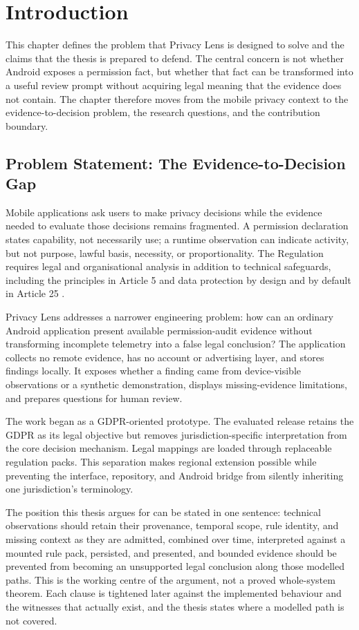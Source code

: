 \chapter{Introduction}

This chapter defines the problem that Privacy Lens is designed to solve and the claims that the thesis is prepared to defend. The central concern is not whether Android exposes a permission fact, but whether that fact can be transformed into a useful review prompt without acquiring legal meaning that the evidence does not contain. The chapter therefore moves from the mobile privacy context to the evidence-to-decision problem, the research questions, and the contribution boundary.

\section{Problem Statement: The Evidence-to-Decision Gap}

Mobile applications ask users to make privacy decisions while the evidence needed to evaluate those decisions remains fragmented. A permission declaration states capability, not necessarily use; a runtime observation can indicate activity, but not purpose, lawful basis, necessity, or proportionality. The Regulation requires legal and organisational analysis in addition to technical safeguards, including the principles in Article 5 and data protection by design and by default in Article 25 \cite{gdpr2016,edpbArticle25}.

Privacy Lens addresses a narrower engineering problem: how can an ordinary Android application present available permission-audit evidence without transforming incomplete telemetry into a false legal conclusion? The application collects no remote evidence, has no account or advertising layer, and stores findings locally. It exposes whether a finding came from device-visible observations or a synthetic demonstration, displays missing-evidence limitations, and prepares questions for human review.

The work began as a GDPR-oriented prototype. The evaluated release retains the GDPR as its legal objective but removes jurisdiction-specific interpretation from the core decision mechanism. Legal mappings are loaded through replaceable regulation packs. This separation makes regional extension possible while preventing the interface, repository, and Android bridge from silently inheriting one jurisdiction's terminology.

The position this thesis argues for can be stated in one sentence: technical observations should retain their provenance, temporal scope, rule identity, and missing context as they are admitted, combined over time, interpreted against a mounted rule pack, persisted, and presented, and bounded evidence should be prevented from becoming an unsupported legal conclusion along those modelled paths. This is the working centre of the argument, not a proved whole-system theorem. Each clause is tightened later against the implemented behaviour and the witnesses that actually exist, and the thesis states where a modelled path is not covered.

